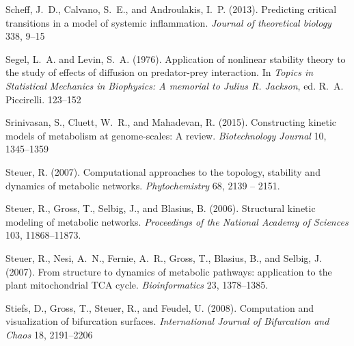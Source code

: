 \documentclass{article}
\begin{document}
\begin{thebibliography}{85}
Scheff, J.~D., Calvano, S.~E., and Androulakis, I.~P. (2013).
\newblock Predicting critical transitions in a model of systemic inflammation.
\newblock \emph{Journal of theoretical biology} 338, 9--15

Segel, L.~A. and Levin, S.~A. (1976).
\newblock Application of nonlinear stability theory to the study of effects of
  diffusion on predator-prey interaction.
\newblock In \emph{Topics in Statistical Mechanics in Biophysics: A memorial to
  Julius R. Jackson}, ed. R.~A. Piccirelli. 123--152

Srinivasan, S., Cluett, W.~R., and Mahadevan, R. (2015).
\newblock Constructing kinetic models of metabolism at genome-scales: A review.
\newblock \emph{Biotechnology Journal} 10, 1345--1359

Steuer, R. (2007).
\newblock Computational approaches to the topology, stability and dynamics of
  metabolic networks.
\newblock \emph{Phytochemistry} 68, 2139 -- 2151.
\newblock {}

Steuer, R., Gross, T., Selbig, J., and Blasius, B. (2006).
\newblock Structural kinetic modeling of metabolic networks.
\newblock \emph{Proceedings of the National Academy of Sciences} 103,
  11868--11873.
\newblock {}

Steuer, R., Nesi, A.~N., Fernie, A.~R., Gross, T., Blasius, B., and Selbig, J.
  (2007).
\newblock From structure to dynamics of metabolic pathways: application to the
  plant mitochondrial TCA cycle.
\newblock \emph{Bioinformatics} 23, 1378--1385.
\newblock {}

Stiefs, D., Gross, T., Steuer, R., and Feudel, U. (2008).
\newblock Computation and visualization of bifurcation surfaces.
\newblock \emph{International Journal of Bifurcation and Chaos} 18, 2191--2206


\end{thebibliography}
\end{document}
